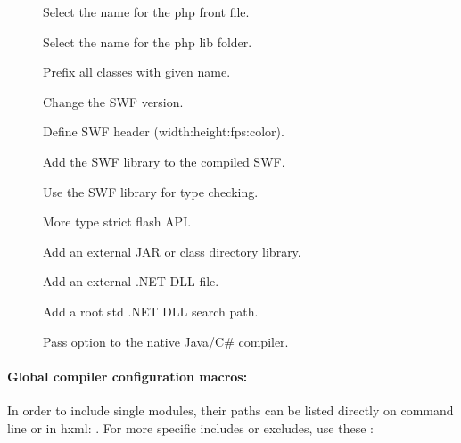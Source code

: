 \begin{description}
	\item[] Select the name for the php front file.
	\item[] Select the name for the php lib folder.
	\item[] Prefix all classes with given name.
	\item[] Change the SWF version.
	\item[] Define SWF header (width:height:fps:color).
	\item[] Add the SWF library to the compiled SWF.
	\item[] Use the SWF library for type checking.
	\item[] More type strict flash API.
	\item[] Add an external JAR or class directory library.
	\item[] Add an external .NET DLL file.
	\item[] Add a root std .NET DLL search path.
	\item[] Pass option  to the native Java/C\# compiler.
\end{description}


\paragraph{Global compiler configuration macros:} 

In order to include single modules, their paths can be listed directly on command line or in hxml: . For more specific includes or excludes, use these :

